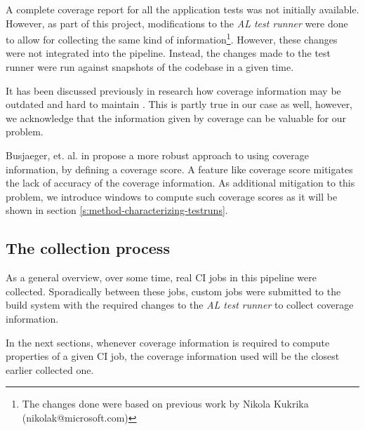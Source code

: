 A complete coverage report for all the application tests was not initially available. However, as 
part of this project, modifications to the \emph{AL test runner} were done to allow 
for collecting the same kind of information\footnote{The changes done were based on 
previous work by Nikola Kukrika (nikolak@microsoft.com)}. However, these changes were not 
integrated into the pipeline. Instead, the changes made to the test runner were run against snapshots of 
the codebase in a given time.

It has been discussed previously in research how coverage information may be
outdated and hard to maintain \cite{Bertolino2020LearningtoRankVR}. This is 
partly true in our case as well, however, we acknowledge that the information 
given by coverage can be valuable for our problem.

Busjaeger, et. al. in \cite{Busjaeger2016LearningFT} propose a more robust approach to using coverage information, by defining
a coverage score. A feature like coverage score mitigates the lack of accuracy 
of the coverage information. As additional mitigation to this problem, we introduce
windows to compute such coverage scores as it will be shown in section \ref{s:method-characterizing-testruns}.

\subsection{The collection process}

As a general overview, over some time, real CI jobs in this pipeline were collected. 
Sporadically between these jobs, custom jobs were submitted to the build system with the required changes
to the \emph{AL test runner} to collect coverage information. 

In the next sections, whenever coverage information is required to compute properties of a given CI job,
the coverage information used will be the closest earlier collected one.
